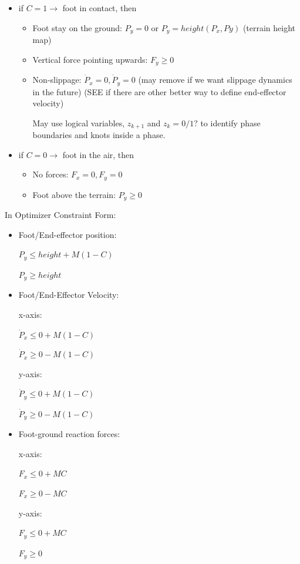 \documentclass[a4paper,10pt]{article}
\begin{document}
\begin{itemize}
	\item if $C = 1 \rightarrow $ foot in contact, then
		
		\begin{itemize}
			\item Foot stay on the ground: $P_y = 0$ or $P_y = height(P_x,Py)$ (terrain height map)
			\item Vertical force pointing upwards: $F_y \geq 0$
			\item Non-slippage: $\dot{P}_x = 0, \dot{P}_y =0$ (may remove if we want slippage dynamics in the future) (SEE if there are other better way to define end-effector velocity)
			
			May use logical variables, $z_{k+1}$ and $z_{k} = 0/1?$ to identify phase boundaries and knots inside a phase.
		\end{itemize}
	
	\item if $C =0 \rightarrow $ foot in the air, then
	
		\begin{itemize}
			\item No forces: $F_x = 0, F_y =0$
			\item Foot above the terrain: $P_y \geq 0$
		\end{itemize}
\end{itemize}

In Optimizer Constraint Form:

\begin{itemize}
	\item Foot/End-effector position:
	
	$P_y \leq height + M(1-C)$
	
	$P_y \geq height$
	
	\item Foot/End-Effector Velocity:
	
	x-axis:
	
	$\dot{P}_x \leq 0 + M(1-C)$
	
	$\dot{P}_x \geq 0 - M(1-C)$
	
	y-axis:
	
	$\dot{P}_y \leq 0 + M(1-C)$
	
	$\dot{P}_y \geq 0 - M(1-C)$
	
	\item Foot-ground reaction forces:
	
	x-axis:
	
	$F_x \leq 0 + MC$
	
	$F_x \geq 0 - MC$
	
	y-axis:
	
	$F_y \leq 0 + MC$
	
	$F_y \geq 0$
	
\end{itemize}
\end{document}

